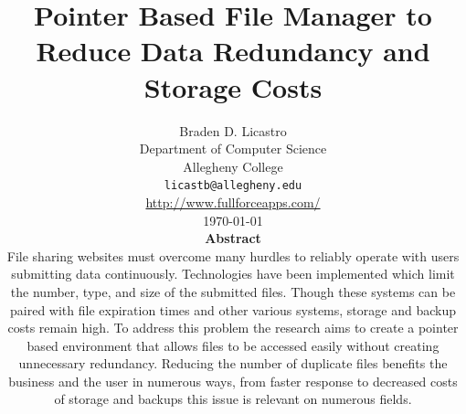 \documentclass[11pt]{article}
\def\widow#1{\vskip #1\vbadness10000\penalty-200\vskip-#1}
\begin{document}



\def\widow#1{\vskip #1\vbadness10000\penalty-200\vskip-#1}


\makeatletter

\def\maketitle{%
  \thispagestyle{empty}%
  \begin{center}%
    {\Huge \@title\par}%
    {\normalsize \@author\par}%
    \vskip .4in
  \end{center}%

  }

\makeatother

\vspace*{-1.1in}
\title{Pointer Based File Manager to Reduce Data Redundancy and Storage Costs}

\author{Braden D. Licastro\\
Department of Computer Science\\
Allegheny College \\
{\tt licastb@allegheny.edu}  \\
\url{http://www.fullforceapps.com/} \\ 
\vspace*{.1in} \today \\ \vspace*{.1in}
{\bf Abstract} \\ File sharing websites must overcome many hurdles to reliably operate with users submitting data continuously. Technologies have been implemented which limit the number, type, and size of the submitted files. Though these systems can be paired with file expiration times and other various systems, storage and backup costs remain high. To address this problem the research aims to create a pointer based environment that allows files to be accessed easily without creating unnecessary redundancy. Reducing the number of duplicate files benefits the business and the user in numerous ways, from faster response to decreased costs of storage and backups this issue is relevant on numerous fields.}
\end{document}
